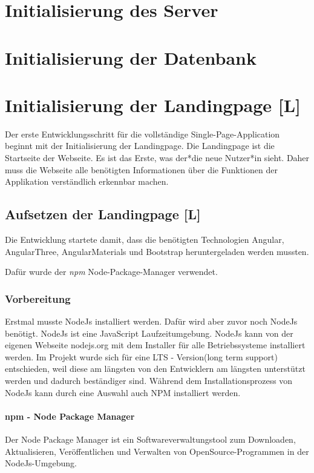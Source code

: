 \section{Initialisierung des Server}
\section{Initialisierung der Datenbank }
\section{Initialisierung der Landingpage [L]}
Der erste Entwicklungsschritt für die vollständige Single-Page-Application beginnt mit der Initialisierung der Landingpage. Die Landingpage ist die Startseite der Webseite. Es ist das Erste, was der*die neue Nutzer*in sieht. Daher muss die Webseite alle benötigten Informationen über die Funktionen der Applikation verständlich erkennbar machen.

\subsection{Aufsetzen der Landingpage [L]}
Die Entwicklung startete damit, dass die benötigten Technologien Angular, AngularThree, AngularMaterials und Bootstrap heruntergeladen werden mussten.

Dafür wurde der \emph{npm} Node-Package-Manager verwendet.


\subsubsection{Vorbereitung}
Erstmal musste NodeJs installiert werden. Dafür wird aber zuvor noch NodeJs benötigt. NodeJs ist eine JavaScript Laufzeitumgebung. NodeJs kann von der eigenen Webseite nodejs.org mit dem Installer für alle Betriebssysteme installiert werden. Im Projekt wurde sich für eine LTS - Version(long term support) entschieden, weil diese am längsten von den Entwicklern am längsten unterstützt werden und dadurch beständiger sind. Während dem Installationsprozess von NodeJs kann durch eine Auswahl auch NPM installiert werden. 

\paragraph{npm - Node Package Manager}
Der Node Package Manager ist ein Softwareverwaltungstool zum Downloaden, Aktualisieren, Veröffentlichen und Verwalten von OpenSource-Programmen in der NodeJs-Umgebung. \cite{whatNpm} \cite{AboutNpm}

